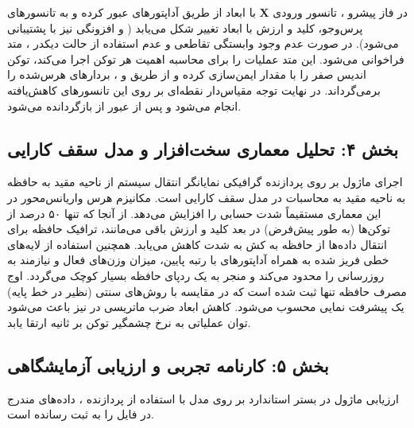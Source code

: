 در فاز پیشرو ، تانسور ورودی $\mathbf{X}$ با ابعاد \lr{[B, L, D]} از طریق آداپتورهای  عبور کرده و به تانسورهای پرس‌وجو، کلید و ارزش با ابعاد \lr{[B, H, L, D\_h]} تغییر شکل می‌یابد ( و افزونگی  نیز با  پشتیبانی می‌شود). در صورت عدم وجود وابستگی تقاطعی  و عدم استفاده از حالت دیکدر ، متد  فراخوانی می‌شود. این متد عملیات  را برای محاسبه اهمیت هر توکن اجرا می‌کند، توکن اندیس صفر را با مقدار  ایمن‌سازی کرده و از طریق  و ، بردارهای هرس‌شده را برمی‌گرداند. در نهایت توجه مقیاس‌دار نقطه‌ای بر روی این تانسورهای کاهش‌یافته انجام می‌شود و پس از عبور از  بازگردانده می‌شود.

\subsection*{بخش ۴: تحلیل معماری سخت‌افزار و مدل سقف کارایی }
اجرای ماژول  بر روی پردازنده گرافیکی  نمایانگر انتقال سیستم از ناحیه مقید به حافظه  به ناحیه مقید به محاسبات  در مدل سقف کارایی  است.
مکانیزم هرس واریانس‌محور در این معماری مستقیماً شدت حسابی  را افزایش می‌دهد. از آنجا که تنها ۵۰ درصد از توکن‌ها (به طور پیش‌فرض) در بعد کلید و ارزش باقی می‌مانند، ترافیک حافظه برای انتقال داده‌ها از حافظه  به کش  به شدت کاهش می‌یابد.
همچنین استفاده از لایه‌های خطی فریز شده به همراه آداپتورهای  با رتبه پایین، میزان وزن‌های فعال و نیازمند به روزرسانی را محدود می‌کند و منجر به یک ردپای حافظه بسیار کوچک می‌گردد. اوج مصرف حافظه  تنها  ثبت شده است که در مقایسه با روش‌های سنتی (نظیر  در خط پایه) یک پیشرفت نمایی محسوب می‌شود. کاهش ابعاد ضرب ماتریسی در  نیز باعث می‌شود توان عملیاتی به نرخ چشمگیر  توکن بر ثانیه ارتقا یابد.

\subsection*{بخش ۵: کارنامه تجربی و ارزیابی آزمایشگاهی }
ارزیابی ماژول در بستر استاندارد بر روی مدل  با استفاده از پردازنده ، داده‌های مندرج در فایل  را به ثبت رسانده است.

